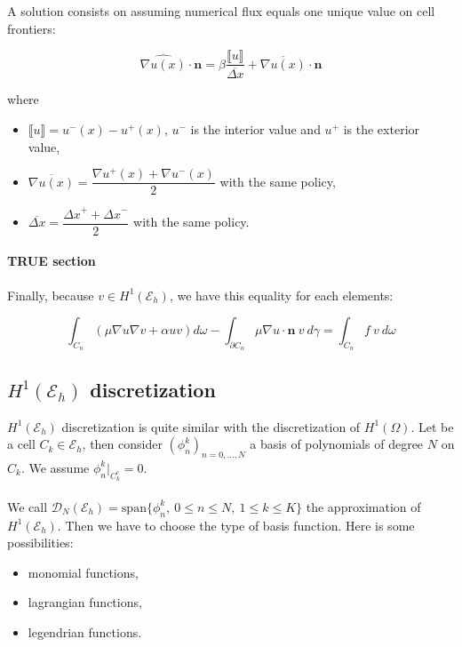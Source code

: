 \documentclass[a4paper,10pt,draft]{article}
\begin{document}
A solution consists on assuming numerical flux equals one unique value on cell frontiers:

$$
\widehat{\nabla u(x)} \cdot \mathbf{n} = \beta \frac{\llbracket u \rrbracket}{\overline{\Delta x}} 
+ \overline{\nabla u(x)} \cdot \mathbf{n}
$$

where 
\begin{itemize}
 \item $\llbracket u \rrbracket = u^-(x) - u^+(x)$, $u^-$ is the interior value and $u^+$ is the 
exterior value,
\item $\overline{\nabla u(x)} = \dfrac{\nabla u^+(x) + \nabla u^-(x)}{2} $ with the same policy,
\item $\overline{\Delta x} = \dfrac{{\Delta x}^+ + {\Delta x}^-}{2}$ with the same policy.
\end{itemize}



\paragraph{TRUE section}
\begin{itshape}
 Finally, because $v \in H^1(\mathcal{E}_h)$, we have this equality for each elements:

$$
\int_{C_n} (\mu \nabla u \nabla v + \alpha uv) d\omega - \int_{\partial C_n} \mu \nabla u \cdot 
\mathbf{n}\ v\ d\gamma = \int_{C_n}  f\ v\ d\omega
$$
\end{itshape}


\subsection{$H^1(\mathcal{E}_h)$ discretization}

 $H^1(\mathcal{E}_h)$ discretization is quite similar with the discretization of $H^1(\Omega)$. Let 
be a cell $C_k \in \mathcal{E}_h$, then consider $(\phi_n^k)_{n=0,\dots,N}$ a basis of 
polynomials of degree $N$ on $C_k$. We assume $\phi_n^k|_{C_k^c}=0$.

\paragraph{}
We call $\mathcal{D}_N(\mathcal{E}_h) = \mathrm{span}\{ \phi_n^k ,\ 0\leq n \leq N,\ 1\leq k 
\leq K \}$ the approximation of $H^1(\mathcal{E}_h)$. Then we have to choose the type of basis 
function. Here is some possibilities:
\begin{itemize}
 \item monomial functions,
 \item lagrangian functions,
 \item legendrian functions.
\end{itemize}
\end{document}
